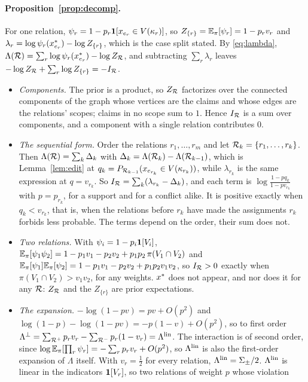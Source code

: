 \paragraph{Proposition~\ref{prop:decomp}.} For one relation, $\psi_r=1-p_r\mathbf{1}\!\left[x_{e_r}\in V(\kappa_r)\right]$,
so $Z_{\{r\}}=\mathbb{E}_\pi[\psi_r]=1-p_rv_r$ and $\lambda_r=\log\psi_r(x^{\ast}_{e_r})-\log Z_{\{r\}}$, which is
the case split stated. By \eqref{eq:lambda}, $\Lambda(\mathcal{R})=\sum_r\log\psi_r(x^{\ast}_{e_r})-\log Z_{\mathcal{R}}$, and
subtracting $\sum_r\lambda_r$ leaves $-\log Z_{\mathcal{R}}+\sum_r\log Z_{\{r\}}=-I_{\mathcal{R}}$.
\begin{itemize}[leftmargin=1.2em,itemsep=1pt,topsep=2pt]
\item \emph{Components.} The prior is a product, so $Z_{\mathcal{R}}$ factorizes over the connected components
  of the graph whose vertices are the claims and whose edges are the relations' scopes; claims in
  no scope sum to $1$. Hence $I_{\mathcal{R}}$ is a sum over components, and a component with a single
  relation contributes $0$.
\item \emph{The sequential form.} Order the relations $r_1,\dots,r_m$ and let $\mathcal{R}_k=\{r_1,\dots,r_k\}$.
  Then $\Lambda(\mathcal{R})=\sum_k\Delta_k$ with $\Delta_k=\Lambda(\mathcal{R}_k)-\Lambda(\mathcal{R}_{k-1})$, which is
  Lemma~\ref{lem:edit} at $q_k=P_{\mathcal{R}_{k-1}}(x_{e_{r_k}}\in V(\kappa_{r_k}))$, while $\lambda_{r_k}$ is
  the same expression at $q=v_{r_k}$. So $I_{\mathcal{R}}=\sum_k(\lambda_{r_k}-\Delta_k)$, and each term is
  $\log\frac{1-p q_k}{1-p v_{r_k}}$ with $p=p_{r_k}$, for a support and for a conflict alike. It is
  positive exactly when $q_k<v_{r_k}$, that is, when the relations before $r_k$ have made the
  assignments $r_k$ forbids less probable. The terms depend on the order, their sum does not.
\item \emph{Two relations.} With $\psi_i=1-p_i\mathbf{1}\!\left[V_i\right]$, $\mathbb{E}_\pi[\psi_1\psi_2]=1-p_1v_1-p_2v_2+p_1p_2\,\pi(V_1\cap V_2)$
  and $\mathbb{E}_\pi[\psi_1]\mathbb{E}_\pi[\psi_2]=1-p_1v_1-p_2v_2+p_1p_2v_1v_2$, so $I_{\mathcal{R}}>0$ exactly when
  $\pi(V_1\cap V_2)>v_1v_2$, for any weights. $x^{\ast}$ does not appear, and nor does it for any $\mathcal{R}$:
  $Z_{\mathcal{R}}$ and the $Z_{\{r\}}$ are prior expectations.
\item \emph{The expansion.} $-\log(1-pv)=pv+O(p^2)$ and $\log(1-p)-\log(1-pv)=-p(1-v)+O(p^2)$, so to
  first order $\Lambda^{\perp}=\sum_{\mathcal{R}^{+}}p_rv_r-\sum_{\mathcal{R}^{-}}p_r(1-v_r)=\Lambda^{\mathrm{lin}}$. The interaction is
  of second order, since $\log\mathbb{E}_\pi[\prod_r\psi_r]=-\sum_rp_rv_r+O(p^2)$, so $\Lambda^{\mathrm{lin}}$ is also the
  first-order expansion of $\Lambda$ itself. With $v_r=\frac12$ for every relation, $\Lambda^{\mathrm{lin}}=\Sigma_{\pm}/2$.
  $\Lambda^{\mathrm{lin}}$ is linear in the indicators $\mathbf{1}\!\left[V_r\right]$, so two relations of weight $p$ whose violation

\end{itemize}
